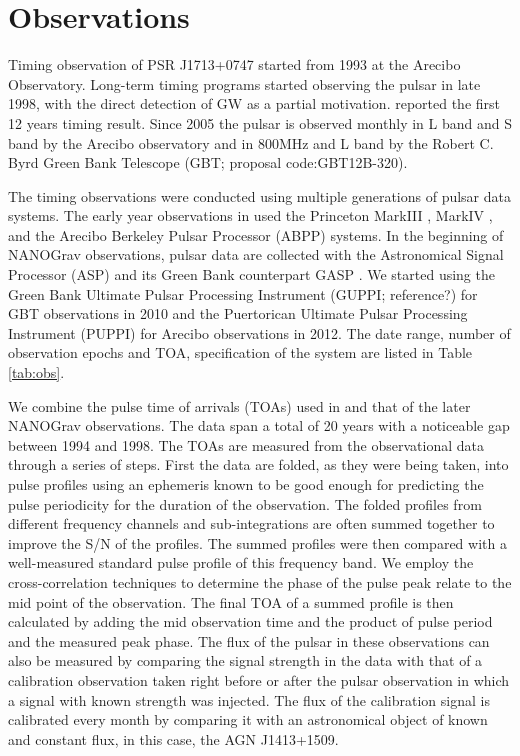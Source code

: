 \section{Observations}
Timing observation of PSR J1713+0747 started from 1993 at the Arecibo
Observatory. Long-term timing programs started observing the pulsar in late 1998, with the direct detection of GW as a partial motivation. \citet{sns+05} reported the first 12 years timing result. Since 2005 the pulsar is observed monthly
in L band and S band by the Arecibo
observatory and in 800MHz and L band by the Robert C. Byrd Green Bank
Telescope (GBT; proposal code:GBT12B-320).

The timing observations were conducted 
using multiple generations of pulsar data systems. The early year
observations in \citet{sns+05} used
 the Princeton MarkIII \citep{skn+92}, MarkIV
\citep{sst+00}, and the Arecibo Berkeley Pulsar Processor (ABPP) systems. 
In the beginning of NANOGrav observations, pulsar data are collected with the Astronomical Signal
Processor (ASP) and its Green Bank counterpart GASP \citep{dem07}. We
started using 
the Green Bank Ultimate Pulsar Processing Instrument (GUPPI; reference?) for GBT 
observations in 2010 and the Puertorican Ultimate Pulsar Processing Instrument
(PUPPI) for Arecibo observations in 2012. 
The date range, number of observation epochs and TOA, specification of the
system are listed in Table \ref{tab:obs}.

We combine the pulse time of arrivals (TOAs) used in \citealt{sns+05} and that
of the later NANOGrav observations. 
The data span a total of 20 years with a noticeable gap between 1994 and 1998.
The TOAs are measured from the observational data through a series of steps. First the data are folded, as they were being taken, into pulse profiles using an ephemeris known to be good enough for predicting the pulse periodicity for the duration of the observation. The folded profiles from different frequency channels and sub-integrations are often summed together to improve the S/N of the profiles.
The summed profiles were then compared with a well-measured standard pulse profile  of this frequency band. We employ the cross-correlation techniques to determine the phase of the pulse peak relate to the mid point of the observation. The final TOA of a summed profile is then calculated by adding the mid observation time and the product of pulse period and the measured peak phase.
The flux of the pulsar in these observations can also be measured by comparing the signal strength in the data with that of a calibration observation taken right before or after the pulsar observation in which a signal with known strength was injected. The flux of the calibration signal is calibrated every month by comparing it with an astronomical object of known and constant flux, in this case, the AGN J1413+1509.




